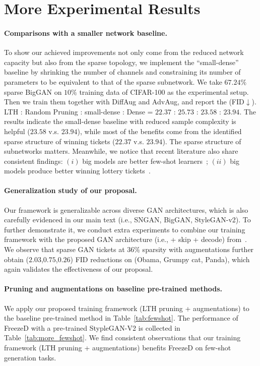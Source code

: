 \documentclass{article}
\begin{document}
\section{More Experimental Results} \label{sec:more_res}

\paragraph{Comparisons with a smaller network baseline.} To show our achieved improvements not only come from the reduced network capacity but also from the sparse topology, we implement the ``small-dense” baseline by shrinking the number of channels and constraining its number of parameters to be equivalent to that of the sparse subnetwork. We take $67.24\%$ sparse BigGAN on $10\%$ training data of CIFAR-100 as the experimental setup. Then we train them together with DiffAug and AdvAug, and report the (FID$\downarrow$). LTH : Random Pruning : small-dense : Dense = $22.37$ : $25.73$ : $23.58$ : $23.94$. The results indicate the small-dense baseline with reduced sample complexity is helpful ($23.58$ v.s. $23.94$), while most of the benefits come from the identified sparse structure of winning tickets ($22.37$ v.s. $23.94$). The sparse structure of subnetworks matters. Meanwhile, we notice that recent literature also share consistent findings: $(i)$ big models are better few-shot learners~\cite{chen2020big}; $(ii)$ big models produce better winning lottery tickets~\cite{chen2020lottery2}.

\paragraph{Generalization study of our proposal.} Our framework is generalizable across diverse GAN architectures, which is also carefully evidenced in our main text (i.e., SNGAN, BigGAN, StyleGAN-v2). To further demonstrate it, we conduct extra experiments to combine our training framework with the proposed GAN architecture (i.e., + skip + decode) from~\cite{liu2020towards}. We observe that sparse GAN tickets at $36\%$ sparsity with augmentations further obtain ($2.03$,$0.75$,$0.26$) FID reductions on (Obama, Grumpy cat, Panda), which again validates the effectiveness of our proposal.

\paragraph{Pruning and augmentations on baseline pre-trained methods.} We apply our proposed training framework (LTH pruning + augmentations) to the baseline pre-trained method in Table~\ref{tab:fewshot}. The performance of FreezeD with a pre-trained StypleGAN-V2 is collected in Table~\ref{tab:more_fewshot}. We find consistent observations that our training framework (LTH pruning + augmentations) benefits FreezeD on few-shot generation tasks.
\end{document}
